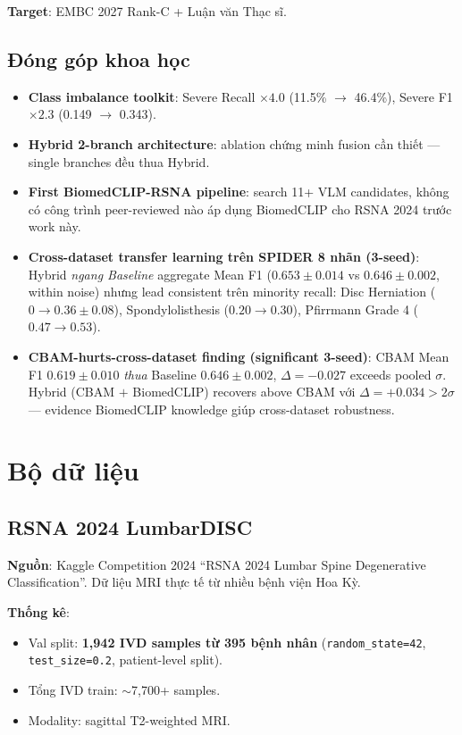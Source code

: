 \documentclass[11pt,a4paper]{article}
\begin{document}
\noindent\textbf{Target}: EMBC 2027 Rank-C + Luận văn Thạc sĩ.

\subsection{Đóng góp khoa học}

\begin{itemize}[leftmargin=*]
\item \textbf{Class imbalance toolkit}: Severe Recall $\times 4.0$
(11.5\% $\to$ 46.4\%), Severe F1 $\times 2.3$ (0.149 $\to$ 0.343).
\item \textbf{Hybrid 2-branch architecture}: ablation chứng minh
fusion cần thiết --- single branches đều thua Hybrid.
\item \textbf{First BiomedCLIP-RSNA pipeline}: search 11+ VLM
candidates, không có công trình peer-reviewed nào áp dụng BiomedCLIP
cho RSNA 2024 trước work này.
\item \textbf{Cross-dataset transfer learning trên SPIDER 8 nhãn
(3-seed)}: Hybrid \emph{ngang Baseline} aggregate Mean F1 ($0.653 \pm
0.014$ vs $0.646 \pm 0.002$, within noise) nhưng lead consistent trên
minority recall: Disc Herniation ($0 \to 0.36 \pm 0.08$),
Spondylolisthesis ($0.20 \to 0.30$), Pfirrmann Grade 4 ($0.47 \to
0.53$).
\item \textbf{CBAM-hurts-cross-dataset finding (significant 3-seed)}:
CBAM Mean F1 $0.619 \pm 0.010$ \emph{thua} Baseline $0.646 \pm 0.002$,
$\Delta = -0.027$ exceeds pooled $\sigma$. Hybrid (CBAM $+$ BiomedCLIP)
recovers above CBAM với $\Delta = +0.034 > 2\sigma$ --- evidence
BiomedCLIP knowledge giúp cross-dataset robustness.
\end{itemize}

\section{Bộ dữ liệu}

\subsection{RSNA 2024 LumbarDISC}

\noindent\textbf{Nguồn}: Kaggle Competition 2024 ``RSNA 2024 Lumbar Spine
Degenerative Classification''. Dữ liệu MRI thực tế từ nhiều bệnh viện
Hoa Kỳ.

\noindent\textbf{Thống kê}:
\begin{itemize}[leftmargin=*]
\item Val split: \textbf{1,942 IVD samples từ 395 bệnh nhân}
(\verb|random_state=42|, \verb|test_size=0.2|, patient-level split).
\item Tổng IVD train: $\sim$7,700+ samples.
\item Modality: sagittal T2-weighted MRI.
\end{itemize}
\end{document}
